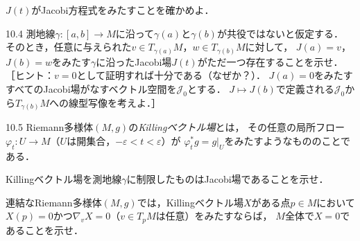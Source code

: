 \documentclass[uplatex,dvipdfmx,fontsize=12pt,jafontsize=11pt,line_length=42zw,number_of_lines=36,hanging_punctuation]{jlreq}
\begin{document}
\begin{enumerate-problems}
\begin{enumerate-subproblems}
			\item
				$J(t)$がJacobi方程式をみたすことを確かめよ．
		\end{enumerate-subproblems}
	\item[10.4]
		測地線$\gamma\colon[a,b]\to M$に沿って$\gamma(a)$と$\gamma(b)$が共役ではないと仮定する．
		そのとき，任意に与えられた$v\in T_{\gamma(a)}M$，$w\in T_{\gamma(b)}M$に対して，
		$J(a)=v$，$J(b)=w$をみたす$\gamma$に沿ったJacobi場$J(t)$がただ一つ存在することを示せ．
		［ヒント：$v=0$として証明すれば十分である（なぜか？）．
		$J(a)=0$をみたすすべてのJacobi場がなすベクトル空間を$\mathcal{J}_0$とする．
		$J\mapsto J(b)$で定義される$\mathcal{J}_0$から$T_{\gamma(b)}M$への線型写像を考えよ．］
	\item[10.5]
		Riemann多様体$(M,g)$の\emph{Killingベクトル場}とは，
		その任意の局所フロー$\varphi_t\colon U\to M$（$U$は開集合，$-\varepsilon<t<\varepsilon$）が
		$\varphi_t^*g=g|_U$をみたすようなもののことである．
		\begin{enumerate-subproblems}
			\item
				Killingベクトル場を測地線$\gamma$に制限したものはJacobi場であることを示せ．
			\item
				連結なRiemann多様体$(M,g)$では，Killingベクトル場$X$がある点$p\in M$において
				$X(p)=0$かつ$\nabla_v X=0$（$v\in T_pM$は任意）をみたすならば，
				$M$全体で$X=0$であることを示せ．
		\end{enumerate-subproblems}
\end{enumerate-problems}
\end{document}
